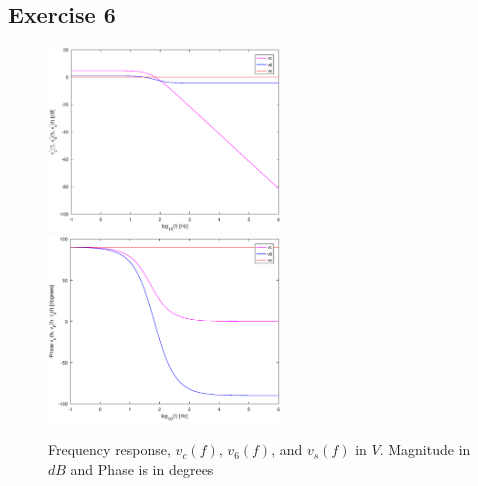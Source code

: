 \newpage
\subsection{Exercise 6}
\label{sec:exercise6}


\begin{figure}[!ht] 
\caption{Frequency response, $v_{c}(f)$, $v_6(f)$, and $v_s(f)$ in $V$. Magnitude in $dB$ and Phase is in degrees}
\includegraphics[width=0.55\textwidth]{theoretical_6_dB.eps}
\hfill\includegraphics[width=0.55\textwidth]{theoretical_6_phase.eps}
\label{fig:theoretical_6}
\end{figure}







